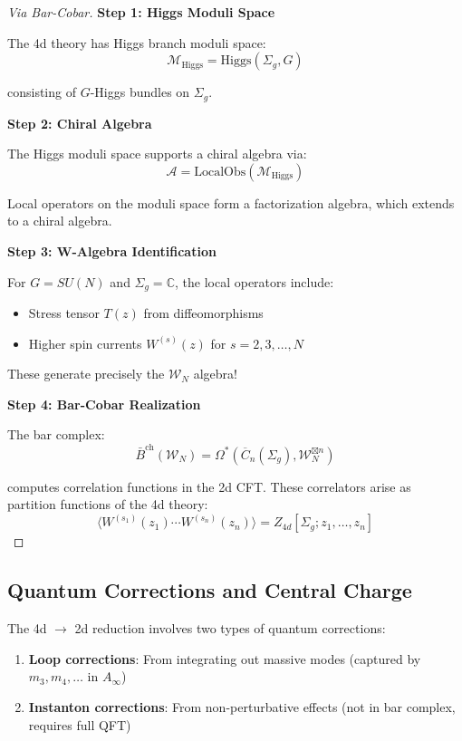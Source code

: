 \begin{proof}[Via Bar-Cobar]
\textbf{Step 1: Higgs Moduli Space}

The 4d theory has Higgs branch moduli space:
$$\mathcal{M}_{\text{Higgs}} = \text{Higgs}(\Sigma_g, G)$$

consisting of $G$-Higgs bundles on $\Sigma_g$.

\textbf{Step 2: Chiral Algebra}

The Higgs moduli space supports a chiral algebra via:
$$\mathcal{A} = \text{LocalObs}(\mathcal{M}_{\text{Higgs}})$$

Local operators on the moduli space form a factorization algebra, which extends 
to a chiral algebra.

\textbf{Step 3: W-Algebra Identification}

For $G = SU(N)$ and $\Sigma_g = \mathbb{C}$, the local operators include:
\begin{itemize}
\item Stress tensor $T(z)$ from diffeomorphisms
\item Higher spin currents $W^{(s)}(z)$ for $s = 2, 3, \ldots, N$
\end{itemize}

These generate precisely the $\mathcal{W}_N$ algebra!

\textbf{Step 4: Bar-Cobar Realization}

The bar complex:
$$\bar{B}^{\text{ch}}(\mathcal{W}_N) = \Omega^*(\overline{C}_n(\Sigma_g), 
\mathcal{W}_N^{\boxtimes n})$$

computes correlation functions in the 2d CFT. These correlators arise as partition 
functions of the 4d theory:
$$\langle W^{(s_1)}(z_1) \cdots W^{(s_n)}(z_n) \rangle = 
Z_{4d}[\Sigma_g; z_1, \ldots, z_n]$$
\end{proof}

\subsection{Quantum Corrections and Central Charge}

\begin{remark}
The 4d $\to$ 2d reduction involves two types of quantum corrections:
\begin{enumerate}
\item \textbf{Loop corrections}: From integrating out massive modes (captured 
by $m_3, m_4, \ldots$ in $A_\infty$)
\item \textbf{Instanton corrections}: From non-perturbative effects (not in bar 
complex, requires full QFT)
\end{enumerate}
\end{remark}

